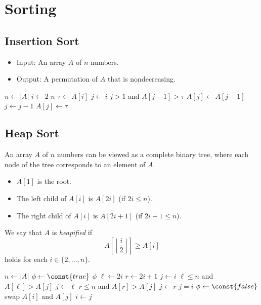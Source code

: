 \chapter{Sorting}
\section{Insertion Sort}
\begin{problem}
  \leavevmode
  \begin{itemize}
    \item Input: An array $A$ of $n$ numbers.
    \item Output: A permutation of $A$ that is nondecreasing.
  \end{itemize}
\end{problem}

\begin{codebox}
  \li $n \gets |A|$
  \li \For $i \gets 2$ \To $n$ \Do
  \li     $\tau \gets A[i]$
  \li     $j \gets i$
  \li     \While $j > 1$ and $A[j - 1] > \tau$ \Do
  \li         $A[j] \gets A[j - 1]$
  \li         $j \gets j - 1$
          \End
  \li     $A[j] \gets \tau$
      \End
\end{codebox}

\section{Heap Sort}
\begin{definition}
  An array $A$ of $n$ numbers can be viewed as a complete binary tree, where
  each node of the tree corresponds to an element of $A$.
  \begin{itemize}
    \item $A[1]$ is the root.
    \item The left child of $A[i]$ is $A[2i]$ (if $2i \leq n$).
    \item The right child of $A[i]$ is $A[2i+1]$ (if $2i+1 \leq n$).
  \end{itemize}
  We say that $A$ is \emph{heapified} if
  \begin{equation*}
    A\left[\left\lfloor\frac{i}{2}\right\rfloor\right] \geq A[i]
  \end{equation*}
  holds for each $i \in \{2, \dots, n\}$.
\end{definition}

\begin{codebox}
  \li $n \gets |A|$
  \li $\phi \gets \const{true}$
  \li \While $\phi$ \Do
  \li     $\ell \gets 2i$
  \li     $r \gets 2i+1$
  \li     $j \gets i$
  \li     \If $\ell \leq n$ and $A[\ell] > A[j]$ \Then
  \li         $j \gets \ell$
          \End
  \li     \If $r \leq n$ and $A[r] > A[j]$ \Then
  \li         $j \gets r$
          \End
  \li     \If $j = i$ \Then
  \li         $\phi \gets \const{false}$
  \li     \Else
  \li         swap $A[i]$ and $A[j]$
  \li         $i \gets j$
          \End
      \End
\end{codebox}


